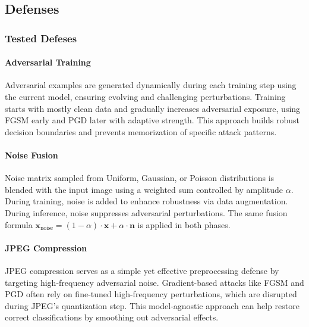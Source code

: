 \documentclass[conference]{IEEEtran}
\begin{document}
\subsection{Defenses}
\subsubsection{Tested Defeses}
\paragraph{Adversarial Training}
 Adversarial examples are generated dynamically during each training step using the current model, ensuring evolving and challenging perturbations. Training starts with mostly clean data and gradually increases adversarial exposure, using FGSM early and PGD later with adaptive strength. This approach builds robust decision boundaries and prevents memorization of specific attack patterns\cite{zheng2020efficientadversarialtrainingtransferable}.
\paragraph{Noise Fusion}
Noise matrix sampled from Uniform, Gaussian, or Poisson distributions is blended with the input image using a weighted sum controlled by amplitude $\alpha$. During training, noise is added to enhance robustness via data augmentation. During inference, noise suppresses adversarial perturbations. The same fusion formula $\mathbf{x}_{\text{noise}} = (1 - \alpha) \cdot \mathbf{x} + \alpha \cdot \mathbf{n}$ is applied in both phases.

\cite{shi2022noisefusion}
\paragraph{JPEG Compression}
JPEG compression serves as a simple yet effective preprocessing defense by targeting high-frequency adversarial noise. Gradient-based attacks like FGSM and PGD often rely on fine-tuned high-frequency perturbations, which are disrupted during JPEG's quantization step. This model-agnostic approach can help restore correct classifications by smoothing out adversarial effects.
\cite{das2017keepingbadguysout}
\end{document}
